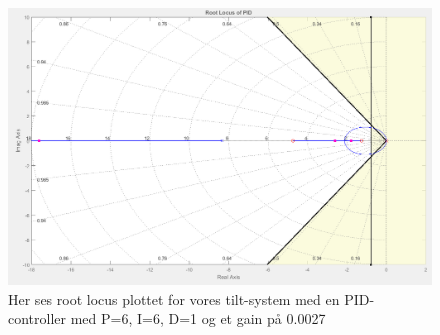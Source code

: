 \begin{figure}[ht]
	\begin{center}
		\includegraphics[scale=0.45]{Billeder/PID_rlocus.PNG}
	\end{center}
\caption{Her ses root locus plottet for vores tilt-system med en PID-controller med P=6, I=6, D=1 og et gain på 0.0027}
\label{fig:PID_rlocus}
\end{figure}